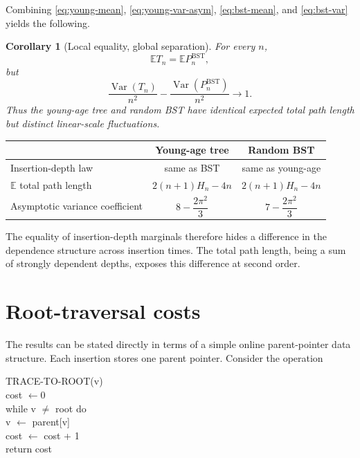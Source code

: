\documentclass[11pt,a4paper]{article}
\newtheorem{corollary}[theorem]{Corollary}
\newcommand{\E}{\mathbb{E}}
\newcommand{\Var}{\operatorname{Var}}
\newcommand{\1}{\mathbf{1}}
\begin{document}
Combining \eqref{eq:young-mean}, \eqref{eq:young-var-asym},
\eqref{eq:bst-mean}, and \eqref{eq:bst-var} yields the following.

\begin{corollary}[Local equality, global separation]\label{cor:bst}
For every $n$,
\[
\E T_n=\E P_n^{\mathrm{BST}},
\]
but
\[
\frac{\Var(T_n)}{n^2}
-
\frac{\Var(P_n^{\mathrm{BST}})}{n^2}
\longrightarrow1.
\]
Thus the young-age tree and random BST have identical expected total path
length but distinct linear-scale fluctuations.
\end{corollary}

\begin{center}
\begin{tabular}{@{}lcc@{}}
\toprule
 & Young-age tree & Random BST\\
\midrule
Insertion-depth law & same as BST & same as young-age\\
$\E$ total path length
& $2(n+1)H_n-4n$
& $2(n+1)H_n-4n$\\
Asymptotic variance coefficient
& $8-\dfrac{2\pi^2}{3}$
& $7-\dfrac{2\pi^2}{3}$\\
\bottomrule
\end{tabular}
\end{center}

The equality of insertion-depth marginals therefore hides a difference in
the dependence structure across insertion times.  The total path length,
being a sum of strongly dependent depths, exposes this difference at second
order.

\section{Root-traversal costs}\label{sec:alg}

The results can be stated directly in terms of a simple online parent-pointer
data structure.  Each insertion stores one parent pointer.  Consider the
operation

\medskip
\noindent
\begin{minipage}{0.92\textwidth}
\ttfamily
TRACE-TO-ROOT(v)\\
\phantom{xx}cost $\leftarrow 0$\\
\phantom{xx}while v $\neq$ root do\\
\phantom{xxxx}v $\leftarrow$ parent[v]\\
\phantom{xxxx}cost $\leftarrow$ cost + 1\\
\phantom{xx}return cost
\end{minipage}
\medskip
\end{document}

